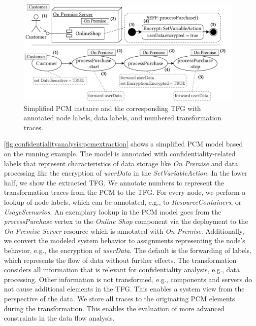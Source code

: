 \begin{figure}
    \centering
    \includegraphics[width=\linewidth]{figures/chapter7/pcmextraction.pdf}
    \caption{Simplified \acf*{PCM} instance and the corresponding \acf*{TFG} with annotated node labels, data labels, and numbered transformation traces.}
    \label{fig:confidentialityanalysis:pcmextraction}
\end{figure}

\autoref{fig:confidentialityanalysis:pcmextraction} shows a simplified \ac{PCM} model based on the running example.
The model is annotated with confidentiality-related labels that represent characteristics of data storage like \emph{On Premise} and data processing like the encryption of \emph{userData} in the \emph{SetVariableAction}.
In the lower half, we show the extracted \ac{TFG}.
We annotate numbers to represent the transformation traces from the \ac{PCM} to the \ac{TFG}.
For every node, we perform a lookup of node labels, which can be annotated, e.g., to \emph{ResourceContainers}, or \emph{UsageScenarios}.
An exemplary lookup in the PCM model goes from the \emph{processPurchase} vertex to the \emph{Online Shop} component via the deployment to the \emph{On Premise Server} resource which is annotated with \emph{On Premise}.
Additionally, we convert the modeled system behavior to assignments representing the node's behavior, e.g., the encryption of \emph{userData}.
The default is the forwarding of labels, which represents the flow of data without further effects.
The transformation considers all information that is relevant for confidentiality analysis, e.g., data processing.
Other information is not transformed, e.g., components and servers do not cause additional elements in the \ac{TFG}.
This enables a system view from the perspective of the data.
We store all traces to the originating \ac{PCM} elements during the transformation.
This enables the evaluation of more advanced constraints in the data flow analysis.

